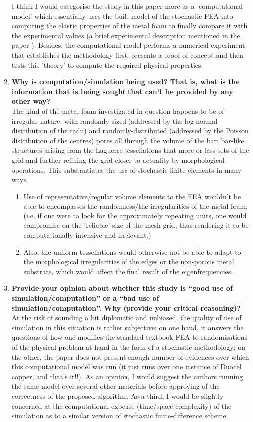 \documentclass{article}
\begin{document}
\begin{enumerate}
	I think I would categorise the study in this paper more as a 'computational model' which essentially uses the built model of the stochastic FEA into computing the elastic properties of the metal foam to finally compare it with the experimental values (a brief experimental description mentioned in the paper \cite{originalpaper}). Besides, the computational model performs a numerical experiment that establishes the methodology first, presents a proof of concept and then tests this 'theory' to compute the required physical properties.
	\item \textbf{Why is computation/simulation being used? That is, what is the information that is being sought that can't be provided by any other way?}\\
	The kind of the metal foam investigated in question happens to be of irregular nature: with randomly-sized (addressed by the log-normal distribution of the radii) and randomly-distributed (addressed by the Poisson distribution of the centres) pores all through the volume of the bar; bar-like structures arising from the Laguerre tessellations that more or less sets of the grid and further refining the grid closer to actuality by morphological operations. This substantiates the use of stochastic finite elements in many ways.
	\begin{enumerate}
		\item Use of representative/regular volume elements to the FEA wouldn't be able to encompasses the randomness/the irregularities of the metal foam. (i.e. if one were to look for the approximately repeating units, one would compromise on the 'reliable' size of the mesh grid, thus rendering it to be computationally intensive and irrelevant.)
		\item Also, the uniform tessellations would otherwise not be able to adapt to the morphological irregularities of the edges or the non-porous metal substrate, which would affect the final result of the eigenfrequencies.
	\end{enumerate}
	\item \textbf{Provide your opinion about whether this study is “good use of simulation/computation” or a “bad use of simulation/computation”. Why (provide your critical reasoning)?}\\
	At the risk of sounding a bit diplomatic and unbiased, the quality of use of simulation in this situation is rather subjective: on one hand, it answers the questions of how one modifies the standard textbook FEA to randomisations of the physical problem at hand in the form of a stochastic methodology; on the other, the paper does not present enough number of evidences over which this computational model was run (it just runs over one instance of Duocel copper, and that's it!!). As an opinion, I would suggest the authors running the same model over several other materials before approving of the correctness of the proposed algorithm. As a third, I would be slightly concerned at the computational expense (time/space complexity) of the simulation as to a similar version of stochastic finite-difference scheme. 
\end{enumerate}
\end{document}
